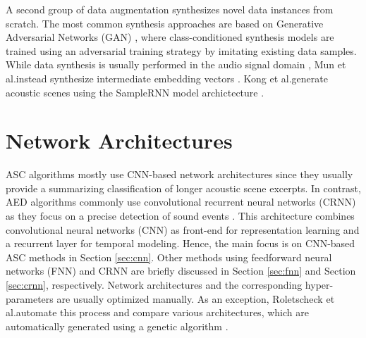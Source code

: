 \documentclass[applsci,article,submit,oneauthor,pdftex]{Definitions/mdpi}
\makeatletter
\newcommand{\etal}{{et al}.\@ }
\newcommand{\secref}[1]{{Section \ref{#1}}}
\makeatother
\begin{document}

A second group of data augmentation synthesizes novel data instances from scratch. 
The most common synthesis approaches are based on Generative Adversarial Networks (GAN) \citep{Goodfellow:2014:GAN:NIPS}, where class-conditioned synthesis models are trained using an adversarial training strategy by imitating existing data samples.
While data synthesis is usually performed in the audio signal domain \citep{Mun:2017:ASC:ICASSP, Chen:2019:ASC:DCASE}, Mun \etal instead synthesize intermediate embedding vectors \citep{Mun:2017:GANASC:DCASE}.
Kong \etal generate acoustic scenes using the SampleRNN model archictecture \citep{Kong:2019:SceneGeneration:ICASSP}.


\section{Network Architectures}
\label{sec:network_architectures}

ASC algorithms mostly use CNN-based network architectures since they usually provide a summarizing classification of longer acoustic scene excerpts.
In contrast, AED algorithms commonly use convolutional recurrent neural networks (CRNN) as they focus on a precise detection of sound events \citep{Xia:2019:EventDetection:CSSR}.
This architecture combines convolutional neural networks (CNN) as front-end for representation learning and a recurrent layer for temporal modeling. 
Hence, the main focus is on CNN-based ASC methods in \secref{sec:cnn}. Other methods using feedforward neural networks (FNN) and CRNN are briefly discussed in \secref{sec:fnn} and \secref{sec:crnn}, respectively.
Network architectures and the corresponding hyper-parameters are  usually optimized manually.
As an exception, Roletscheck \etal automate this process and compare various architectures, which are automatically generated using a genetic algorithm \citep{Roletscheck:2019:EvolutionaryASC:DCASE}.



\end{document}
